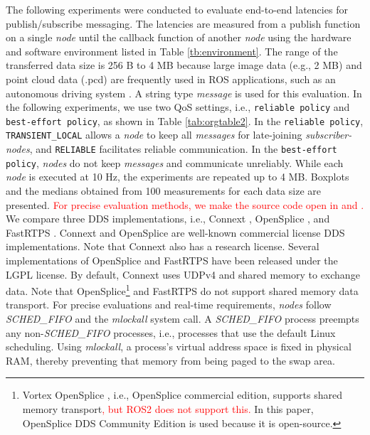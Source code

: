 \documentclass{sig-alternate-05-2015}
\begin{document}
The following experiments were conducted to evaluate end-to-end latencies for publish/subscribe messaging. 
The latencies are measured from a publish function on a single \emph{node} until the callback function of another \emph{node} using the hardware and software environment listed in Table \ref{tb:environment}. 
The range of the transferred data size is 256 B to 4 MB because large image data (e.g., 2 MB) and point cloud data (.pcd) are frequently used in ROS applications, such as an autonomous driving system \cite{kato2015open}.
A string type \emph{message} is used for this evaluation.
In the following experiments, we use two QoS settings, i.e.,  \texttt{reliable policy} and \texttt{best-effort policy}, as shown in Table \ref{tab:orgtable2}. 
In the \texttt{reliable policy}, \texttt{TRANSIENT\_LOCAL} allows a \emph{node} to keep all \emph{messages} for late-joining \emph{subscriber-nodes}, and \texttt{RELIABLE} facilitates reliable communication.
In the \texttt{best-effort policy}, \emph{nodes} do not keep \emph{messages} and communicate unreliably.
While each \emph{node} is executed at 10 Hz, the experiments are repeated up to 4 MB. Boxplots and the medians obtained from 100 measurements for each data size are presented.
\textcolor{red}{For precise evaluation methods, we make the source code open in \cite{m_yuya_ros1} and \cite{m_yuya_ros2}.}
We compare three DDS implementations, i.e., Connext \cite{rti_connext}, OpenSplice \cite{ospl_dds_community}, and FastRTPS \cite{fastrtps}. 
Connext and OpenSplice are well-known commercial license DDS implementations. 
Note that Connext also has a research license. 
Several implementations of OpenSplice and FastRTPS have been released under the LGPL license. 
By default, Connext uses UDPv4 and shared memory to exchange data. 
Note that OpenSplice\footnote{Vortex OpenSplice \cite{ospl_vortex}, i.e., OpenSplice commercial edition, supports shared memory transport\textcolor{red}{, but ROS2 does not support this.} In this paper, OpenSplice DDS Community Edition is used because it is open-source.} 
and FastRTPS do not support shared memory data transport. 
For precise evaluations and real-time requirements, \emph{nodes} follow \emph{SCHED\_FIFO} \cite{garg2009real} and the \emph{mlockall} system call. 
A \emph{SCHED\_FIFO} process preempts any non-\emph{SCHED\_FIFO} processes, i.e., processes that use the default Linux scheduling.
Using \emph{mlockall}, a process's virtual address space is fixed in physical RAM, thereby preventing that memory from being paged to the swap area.
\end{document}
